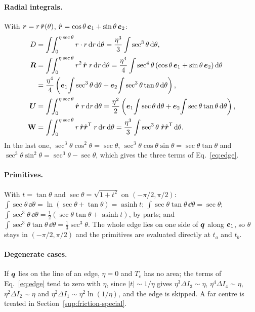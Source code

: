 \paragraph{Radial integrals.} With $\boldsymbol{r} = r\,\hat{\boldsymbol{r}}(\theta)$,
$\hat{\boldsymbol{r}} = \cos\theta\,\boldsymbol{e}_1 + \sin\theta\,\boldsymbol{e}_2$:
\begin{align*}
  D &= \int\!\!\int_0^{\eta\sec\theta} r\cdot r\,\dd r\,\dd\theta
     = \frac{\eta^3}{3}\int\sec^3\theta\,\dd\theta ,\\
  \vect{R} &= \int\!\!\int_0^{\eta\sec\theta} r^2\,\hat{\rr}\; r\,\dd r\,\dd\theta
     = \frac{\eta^4}{4}\int\sec^4\theta\,(\cos\theta\,\vect{e}_1 + \sin\theta\,\vect{e}_2)\,\dd\theta\\
    &= \frac{\eta^4}{4}\left(\vect{e}_1\!\int\sec^3\theta\,\dd\theta
        + \vect{e}_2\!\int\sec^3\theta\tan\theta\,\dd\theta\right),\\
  \vect{U} &= \int\!\!\int_0^{\eta\sec\theta} \hat{\rr}\; r\,\dd r\,\dd\theta
     = \frac{\eta^2}{2}\left(\vect{e}_1\!\int\sec\theta\,\dd\theta
        + \vect{e}_2\!\int\sec\theta\tan\theta\,\dd\theta\right),\\
  \tens{W} &= \int\!\!\int_0^{\eta\sec\theta} r\,\hat{\rr}\hat{\rr}^{\mathsf T}\; r\,\dd r\,\dd\theta
     = \frac{\eta^3}{3}\int\sec^3\theta\;\hat{\rr}\hat{\rr}^{\mathsf T}\,\dd\theta .
\end{align*}
In the last one, $\sec^3\theta\cos^2\theta = \sec\theta$,
$\sec^3\theta\cos\theta\sin\theta = \sec\theta\tan\theta$ and
$\sec^3\theta\sin^2\theta = \sec^3\theta - \sec\theta$, which gives the three terms of
Eq.~\eqref{eq:edge}.

\paragraph{Primitives.} With $t = \tan\theta$ and $\sec\theta = \sqrt{1+t^2}$ on
$(-\pi/2, \pi/2)$: $\int\sec\theta\,\dd\theta = \ln(\sec\theta + \tan\theta) =
\operatorname{asinh} t$; $\int\sec\theta\tan\theta\,\dd\theta = \sec\theta$;
$\int\sec^3\theta\,\dd\theta = \tfrac12(\sec\theta\tan\theta + \operatorname{asinh} t)$, by parts;
and $\int\sec^3\theta\tan\theta\,\dd\theta = \tfrac13\sec^3\theta$. The whole edge lies on one
side of $\boldsymbol{q}$ along $\boldsymbol{e}_1$, so $\theta$ stays in $(-\pi/2, \pi/2)$ and the primitives are
evaluated directly at $t_a$ and $t_b$.

\paragraph{Degenerate cases.} If $\boldsymbol{q}$ lies on the line of an edge, $\eta = 0$ and $T_e$ has no
area; the terms of Eq.~\eqref{eq:edge} tend to zero with $\eta$, since $|t|\sim 1/\eta$ gives
$\eta^3\Delta I_3\sim \eta$, $\eta^4\Delta I_4\sim \eta$, $\eta^2\Delta I_2\sim \eta$ and
$\eta^2\Delta I_1\sim \eta^2\ln(1/\eta)$, and the edge is skipped. A far centre is treated in
Section~\ref{sup:friction-special}.

